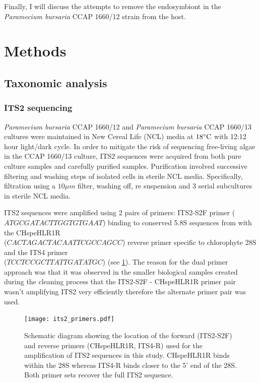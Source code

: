 Finally, I will discuss the attempts to remove the endosymbiont in the 
\textit{Paramecium bursaria} CCAP 1660/12 strain from the host.

\section{Methods}

\subsection{Taxonomic analysis}
    
\subsubsection{ITS2 sequencing}

\textit{Paramecium bursaria} CCAP 1660/12 and \textit{Paramecium bursaria} CCAP 
1660/13 cultures were maintained in New Cereal Life (NCL) media
at \(18\celsius\) with 12:12 hour light/dark cycle.  In order to mitigate
the risk of sequencing free-living algae in the CCAP 1660/13 culture, ITS2
sequences were acquired from both pure culture samples and carefully purified samples.
Purification involved successive filtering and washing steps of isolated cells in sterile NCL media. 
Specifically, filtration using a \(10\mu m\) filter, washing off, re suspension and 3 serial subcultures
in sterile NCL media. 

ITS2 sequences were amplified using 2 pairs of primers: ITS2-S2F primer (\(ATGCGATACTTGGTGTGAAT\))
binding to conserved 5.8S sequences from \citep{Chen2010} with the CHspeHLR1R \\
(\(CACTAGACTACAATTCGCCAGCC\))
reverse primer specific to chlorophyte 28S \citep{Hoshina2004} and the ITS4 primer \\
(\(TCCTCCGCTTATTGATATGC\))
\citep{white1990amplification} (see \cref{fig:its2_primers}).  The reason for the dual primer
approach was that it was observed in the smaller biological samples created during the cleaning
process that the ITS2-S2F - CHspeHLR1R primer pair wasn't amplifying ITS2 very efficiently
therefore the alternate primer pair was used. 

\begin{figure}
    \texttt{[image: its2\_primers.pdf]}
    \caption[ITS2 primer locations]{Schematic diagram showing the location of the forward (ITS2-S2F) and reverse
    primers (CHspeHLR1R, ITS4-R) used for the amplification of ITS2 sequences in this study.
    CHspeHLR1R binds within the 28S whereas ITS4-R binds closer to the 5' end of the 28S.  Both
primer sets recover the full ITS2 sequence.}
    \label{fig:its2_primers}
\end{figure}

